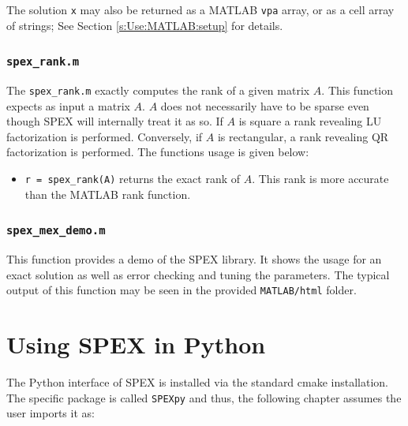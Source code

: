 \documentclass[12pt,oneside]{book}
\theoremstyle{definition}
\begin{document}
The solution \verb|x| may also be returned as a MATLAB \verb|vpa| array, or as
a cell array of strings; See Section \ref{s:Use:MATLAB:setup} for details.

\subsection{\texttt{spex\_rank.m}}
The \verb|spex_rank.m| exactly computes the rank of a given matrix $A$. This function expects as input a matrix $A$. $A$ does not necessarily have to be sparse
even though SPEX will internally treat it as so. If $A$ is square a rank revealing LU factorization is performed. Conversely, if $A$ is rectangular, a rank revealing QR factorization is performed. The functions usage is given below:

\begin{itemize}

\item \verb|r = spex_rank(A)| returns the exact rank of $A$. This rank is more accurate than the MATLAB rank function.

\end{itemize}

\subsection{\texttt{spex\_mex\_demo.m}}
This function provides a demo of the SPEX library. It shows the usage for an exact
solution as well as error checking and tuning the parameters. The typical output
of this function may be seen in the provided \verb|MATLAB/html| folder.



\chapter{Using SPEX in Python}\vspace{-0.75in}
The Python interface of SPEX is installed via the standard cmake installation. The specific package is called \verb|SPEXpy| and thus, the following chapter assumes the user imports it as:
\end{document}
